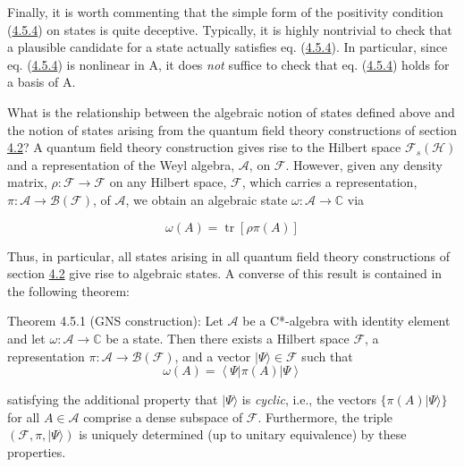 \documentclass[11pt,a4paper]{article}
\providecommand{\ket}[1]{\left\lvert#1\right\rangle}
\providecommand{\bra}[1]{\left\langle#1\right\rvert}
\begin{document}
Finally, it is worth commenting that the simple form of the positivity condition (\hyperref[eq:4.5.4]{4.5.4}) on states is quite deceptive. Typically, it is highly nontrivial to check that a plausible candidate for a state actually satisfies eq. (\hyperref[eq:4.5.4]{4.5.4}). In particular, since eq. (\hyperref[eq:4.5.4]{4.5.4}) is nonlinear in A, it does \emph{not} suffice to check that eq. (\hyperref[eq:4.5.4]{4.5.4}) holds for a basis of A.

What is the relationship between the algebraic notion of states defined above and the notion of states arising from the quantum field theory constructions of section \hyperlink{sec:4.2}{4.2}? A quantum field theory construction gives rise to the Hilbert space \(\mathcal{F}_s(\mathcal{H})\) and a representation of the Weyl algebra, \(\mathcal{A}\), on \(\mathcal{F}\). However, given any density matrix, \(\rho: \mathcal{F} \to \mathcal{F}\) on any Hilbert space, \(\mathcal{F}\), which carries a representation, \(\pi:\mathcal A\to\mathcal B(\mathcal F)\), of \(\mathcal{A}\), we obtain an algebraic state \(\omega: \mathcal{A} \to \mathbb{C}\) via

\hypertarget{source-89}{}
\begin{equation*}
\omega(A) = \operatorname{tr}[\rho \pi(A)] \tag{4.5.7}\label{eq:4.5.7}
\end{equation*}

Thus, in particular, all states arising in all quantum field theory constructions of section \hyperlink{sec:4.2}{4.2} give rise to algebraic states. A converse of this result is contained in the following theorem:

Theorem 4.5.1 (GNS construction): Let \(\mathcal{A}\) be a C*-algebra with identity element and let \(\omega: \mathcal{A} \to \mathbb{C}\) be a state. Then there exists a Hilbert space \(\mathcal{F}\), a representation \(\pi:\mathcal A\to\mathcal B(\mathcal F)\), and a vector \(\lvert \Psi\rangle \in \mathcal{F}\) such that
\begin{equation*}
\omega(A)=\bra{\Psi}\pi(A)\ket{\Psi} \tag{4.5.8}\label{eq:4.5.8}
\end{equation*}

satisfying the additional property that \(\lvert \Psi\rangle\) is \emph{cyclic}, i.e., the vectors \(\{\pi(A)\lvert \Psi\rangle\}\) for all \(A\in\mathcal{A}\) comprise a dense subspace of \(\mathcal{F}\). Furthermore, the triple \((\mathcal{F},\pi,\lvert \Psi\rangle)\) is uniquely determined (up to unitary equivalence) by these properties.
\end{document}
